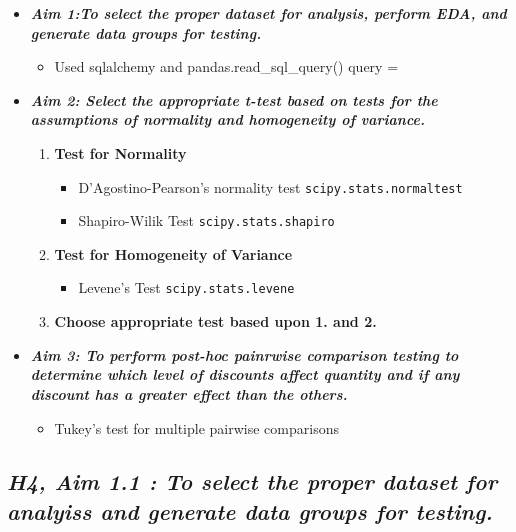 \documentclass[11pt]{article}
\providecommand{\tightlist}{%
      \setlength{\itemsep}{0pt}\setlength{\parskip}{0pt}}
\begin{document}
\begin{itemize}
\tightlist
\item
  \textbf{\emph{Aim 1:To select the proper dataset for analysis, perform
  EDA, and generate data groups for testing.}}

  \begin{itemize}
  \tightlist
  \item
    Used sqlalchemy and pandas.read\_sql\_query() query =
  \end{itemize}
\item
  \textbf{\emph{Aim 2: Select the appropriate t-test based on tests for
  the assumptions of normality and homogeneity of variance.}}

  \begin{enumerate}
  \def\labelenumi{\arabic{enumi}.}
  \tightlist
  \item
    \textbf{Test for Normality}

    \begin{itemize}
    \tightlist
    \item
      D'Agostino-Pearson's normality test
      \texttt{scipy.stats.normaltest}
    \item
      Shapiro-Wilik Test \texttt{scipy.stats.shapiro}
    \end{itemize}
  \item
    \textbf{Test for Homogeneity of Variance}

    \begin{itemize}
    \tightlist
    \item
      Levene's Test \texttt{scipy.stats.levene}
    \end{itemize}
  \item
    \textbf{Choose appropriate test based upon 1. and 2.}
  \end{enumerate}
\item
  \textbf{\emph{Aim 3: To perform post-hoc painrwise comparison testing
  to determine which level of discounts affect quantity and if any
  discount has a greater effect than the others.}}

  \begin{itemize}
  \tightlist
  \item
    Tukey's test for multiple pairwise comparisons
  \end{itemize}
\end{itemize}

    \hypertarget{h4-aim-1.1-to-select-the-proper-dataset-for-analyiss-and-generate-data-groups-for-testing.}{%
\subsection{\texorpdfstring{\textbf{\emph{H4, Aim 1.1 : To select the
proper dataset for analyiss and generate data groups for
testing.}}}{H4, Aim 1.1 : To select the proper dataset for analyiss and generate data groups for testing.}}\label{h4-aim-1.1-to-select-the-proper-dataset-for-analyiss-and-generate-data-groups-for-testing.}}
\end{document}
